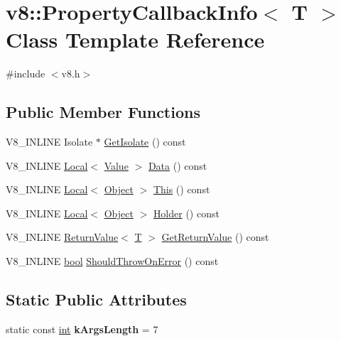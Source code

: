 \hypertarget{classv8_1_1PropertyCallbackInfo}{}\section{v8\+:\+:Property\+Callback\+Info$<$ T $>$ Class Template Reference}
\label{classv8_1_1PropertyCallbackInfo}


{\ttfamily \#include $<$v8.\+h$>$}

\subsection*{Public Member Functions}
\begin{DoxyCompactItemize}
\item 
V8\+\_\+\+I\+N\+L\+I\+NE Isolate $\ast$ \mbox{\hyperlink{classv8_1_1PropertyCallbackInfo_aff7b838ede308ab8a42890962eb9271c}{Get\+Isolate}} () const
\item 
V8\+\_\+\+I\+N\+L\+I\+NE \mbox{\hyperlink{classv8_1_1Local}{Local}}$<$ \mbox{\hyperlink{classv8_1_1Value}{Value}} $>$ \mbox{\hyperlink{classv8_1_1PropertyCallbackInfo_a0156bad4329132beddee04f2d000c617}{Data}} () const
\item 
V8\+\_\+\+I\+N\+L\+I\+NE \mbox{\hyperlink{classv8_1_1Local}{Local}}$<$ \mbox{\hyperlink{classv8_1_1Object}{Object}} $>$ \mbox{\hyperlink{classv8_1_1PropertyCallbackInfo_af46300339d2f31d8dc84a06d74ed6c3c}{This}} () const
\item 
V8\+\_\+\+I\+N\+L\+I\+NE \mbox{\hyperlink{classv8_1_1Local}{Local}}$<$ \mbox{\hyperlink{classv8_1_1Object}{Object}} $>$ \mbox{\hyperlink{classv8_1_1PropertyCallbackInfo_a66b7ec267f18bd84e8baf0a0e16187b9}{Holder}} () const
\item 
V8\+\_\+\+I\+N\+L\+I\+NE \mbox{\hyperlink{classv8_1_1ReturnValue}{Return\+Value}}$<$ \mbox{\hyperlink{classv8_1_1internal_1_1torque_1_1T}{T}} $>$ \mbox{\hyperlink{classv8_1_1PropertyCallbackInfo_aa0882946929c3c4df6d131fe0d8d6746}{Get\+Return\+Value}} () const
\item 
V8\+\_\+\+I\+N\+L\+I\+NE \mbox{\hyperlink{classbool}{bool}} \mbox{\hyperlink{classv8_1_1PropertyCallbackInfo_a82d79a9cdaac9807a0fa17331b159ce9}{Should\+Throw\+On\+Error}} () const
\end{DoxyCompactItemize}
\subsection*{Static Public Attributes}
\begin{DoxyCompactItemize}
\item 
\mbox{\label{classv8_1_1PropertyCallbackInfo_a9fc9663a2e23f9324fe61f92d1e7e5b5}} 
static const \mbox{\hyperlink{classint}{int}} {\bfseries k\+Args\+Length} = 7
\end{DoxyCompactItemize}

